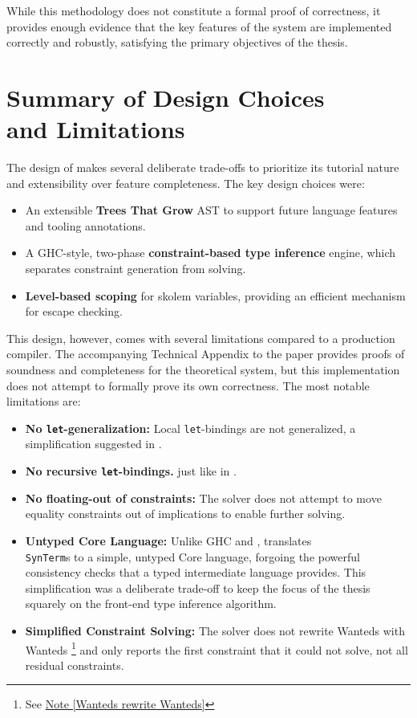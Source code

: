 While this methodology does not constitute a formal proof of correctness, it provides enough evidence that the key features of the system are implemented correctly and robustly, satisfying the primary objectives of the thesis.

\section[Summary of Design Choices and Limitations]{Summary of Design Choices \\ and Limitations}
\label{sec:Design:Summary}

The design of \Arralac makes several deliberate trade-offs to prioritize its tutorial nature and extensibility over feature completeness. The key design choices were:
\begin{itemize}
    \item An extensible \textbf{Trees That Grow} AST to support future language features and tooling annotations.
    \item A GHC-style, two-phase \textbf{constraint-based type inference} engine, which separates constraint generation from solving.
    \item \textbf{Level-based scoping} for skolem variables, providing an efficient mechanism for escape checking.
\end{itemize}

This design, however, comes with several limitations compared to a production compiler. The accompanying Technical Appendix to the paper \cite{practical-type-inference-proofs} provides proofs of soundness and completeness for the theoretical system, but this implementation does not attempt to formally prove its own correctness. The most notable limitations are:
\begin{itemize}
    \item \textbf{No \texttt{let}-generalization:} Local \texttt{let}-bindings are not generalized, a simplification suggested in \cite{vytiniotis-outsideinx-2011}.
    \item \textbf{No recursive \texttt{let}-bindings.} just like in \cite{jones-practical-2007}.
    \item \textbf{No floating-out of constraints:} The solver does not attempt to move equality constraints out of implications to enable further solving.
    \item \textbf{Untyped Core Language:} Unlike GHC and \cite{jones-practical-2007}, \Arralac translates \\ \texttt{SynTerm}s to a simple, untyped Core language, forgoing the powerful consistency checks that a typed intermediate language provides. This simplification was a deliberate trade-off to keep the focus of the thesis squarely on the front-end type inference algorithm.
    \item \textbf{Simplified Constraint Solving:} The solver does not rewrite Wanteds with Wanteds \footnote{See \href{https://github.com/ghc/ghc/blob/ed38c09bd89307a7d3f219e1965a0d9743d0ca73/compiler/GHC/Tc/Types/Constraint.hs\#L2415}{Note [Wanteds rewrite Wanteds]}} and only reports the first constraint that it could not solve, not all residual constraints.
\end{itemize}
